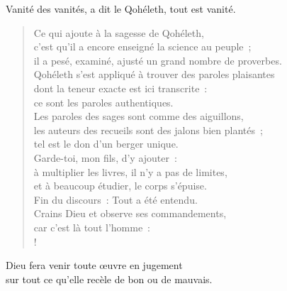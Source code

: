 \documentclass[french,twoside]{book} %
\newif\ifdev
\renewcommand{\LettrineFontHook}{\color{rubric}}
\newcommand{\initialiv}[2]{%
  \let\oldLFH\LettrineFontHook
  \IfSubStr{QJ’}{#1}{
    \lettrine[lines=4, lhang=0.2, loversize=-0.1, lraise=0.2]{\smash{#1}}{#2}
  }{\IfSubStr{É}{#1}{
    \lettrine[lines=4, lhang=0.2, loversize=-0, lraise=0]{\smash{#1}}{#2}
  }{\IfSubStr{ÀÂ}{#1}{
    \lettrine[lines=4, lhang=0.2, loversize=-0, lraise=0, slope=0.6em]{\smash{#1}}{#2}
  }{\IfSubStr{A}{#1}{
    \lettrine[lines=4, lhang=0.2, loversize=0.2, slope=0.6em]{\smash{#1}}{#2}
  }{\IfSubStr{V}{#1}{
    \lettrine[lines=4, lhang=0.2, loversize=0.2, slope=-0.5em]{\smash{#1}}{#2}
  }{
    \lettrine[lines=4, lhang=0.2, loversize=0.2]{\smash{#1}}{#2}
  }}}}}
  \let\LettrineFontHook\oldLFH
}
\renewcommand{\LettrineFontHook}{\bfseries\color{rubric}}
\begin{document}
Vanité des vanités, a dit le Qohéleth, tout est vanité.\\

\begin{verse}
Ce qui ajoute à la sagesse de Qohéleth, \\
c’est qu’il a encore enseigné la science au peuple ; \\
il a pesé, examiné, ajusté un grand nombre de proverbes.\\
Qohéleth s’est appliqué à trouver des paroles plaisantes \\
dont la teneur exacte est ici transcrite : \\
ce sont les paroles authentiques.\\
Les paroles des sages sont comme des aiguillons, \\
les auteurs des recueils sont des jalons bien plantés ; \\
tel est le don d’un berger unique.\\
Garde-toi, mon fils, d’y ajouter : \\
à multiplier les livres, il n’y a pas de limites, \\
et à beaucoup étudier, le corps s’épuise.\\
Fin du discours : Tout a été entendu. \\
Crains Dieu et observe ses commandements, \\
car c’est là tout l’homme :\\!
\end{verse}
Dieu fera venir toute œuvre en jugement \\
sur tout ce qu’elle recèle de bon ou de mauvais.\\
\noindent 
 


\ifbooklet
  \newpage\null\thispagestyle{empty}\newpage
\fi

\ifdev %
\fontname\font — \textsc{Les règles du jeu}\par
(\hyperref[utopie]{\underline{Lien}})\par
\noindent \initialiv{A}{lors là}\blindtext\par
\noindent \initialiv{À}{ la bonheur des dames}\blindtext\par
\noindent \initialiv{É}{tonnez-le}\blindtext\par
\noindent \initialiv{Q}{ualitativement}\blindtext\par
\noindent \initialiv{V}{aloriser}\blindtext\par
\Blindtext
\phantomsection
\label{utopie}
\Blinddocument
\fi
\end{document}
